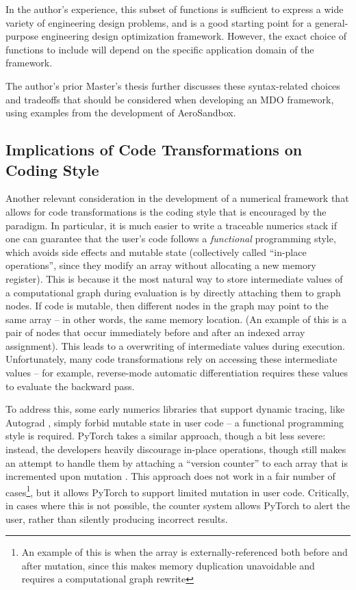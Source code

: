 In the author's experience, this subset of functions is sufficient to express a wide variety of engineering design problems, and is a good starting point for a general-purpose engineering design optimization framework. However, the exact choice of functions to include will depend on the specific application domain of the framework.

The author's prior Master's thesis \cite{sharpe_aerosandbox_2021} further discusses these syntax-related choices and tradeoffs that should be considered when developing an MDO framework, using examples from the development of AeroSandbox.

\subsection{Implications of Code Transformations on Coding Style}
\label{sec:code_style}

Another relevant consideration in the development of a numerical framework that allows for code transformations is the coding style that is encouraged by the paradigm. In particular, it is much easier to write a traceable numerics stack if one can guarantee that the user's code follows a \emph{functional} programming style, which avoids side effects and mutable state (collectively called ``in-place operations'', since they modify an array without allocating a new memory register). This is because it the most natural way to store intermediate values of a computational graph during evaluation is by directly attaching them to graph nodes. If code is mutable, then different nodes in the graph may point to the same array -- in other words, the same memory location. (An example of this is a pair of nodes that occur immediately before and after an indexed array assignment). This leads to a overwriting of intermediate values during execution. Unfortunately, many code transformations rely on accessing these intermediate values -- for example, reverse-mode automatic differentiation requires these values to evaluate the backward pass.

To address this, some early numerics libraries that support dynamic tracing, like Autograd \cite{maclaurin_autograd_2015, maclaurin_modeling_2016}, simply forbid mutable state in user code -- a functional programming style is required. PyTorch takes a similar approach, though a bit less severe: instead, the developers heavily discourage in-place operations, though still makes an attempt to handle them by attaching a ``version counter'' to each array that is incremented upon mutation \cite{paszke_pytorch_2019}. This approach does not work in a fair number of cases\footnote{An example of this is when the array is externally-referenced both before and after mutation, since this makes memory duplication unavoidable and requires a computational graph rewrite}, but it allows PyTorch to support limited mutation in user code. Critically, in cases where this is not possible, the counter system allows PyTorch to alert the user, rather than silently producing incorrect results.

